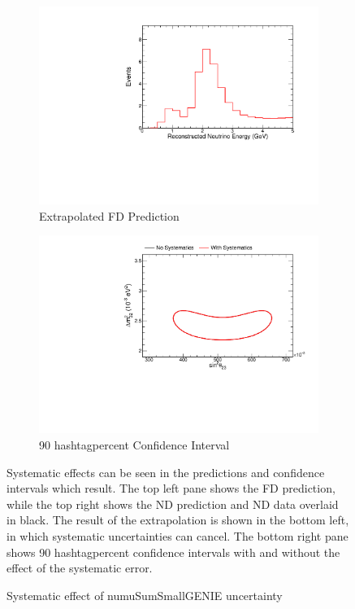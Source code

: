 {\begin{figure}
\begin{center}
\begin{subfigure}[c]{0.49\textwidth}
\includegraphics[width=\textwidth]{figures/systs/prediction/fd_extrap_prediction_numuSumSmallGENIE.pdf}
\caption*{Extrapolated FD Prediction}
\end{subfigure}
\begin{subfigure}[c]{0.49\textwidth}
\includegraphics[width=\textwidth]{figures/systs/prediction/fd_extrap_contour_numuSumSmallGENIE.pdf}
\caption*{90 hashtagpercent Confidence Interval}
\end{subfigure}
\end{center}
\caption{Systematic effect of numuSumSmallGENIE uncertainty}{
Systematic effects can be seen in the predictions and confidence intervals
which result.
The top left pane shows the FD prediction, while the top right shows the
ND prediction and ND data overlaid in black.
The result of the extrapolation is shown in the bottom left, in which
systematic uncertainties can cancel.
The bottom right pane shows 90 hashtagpercent confidence intervals with and without
the effect of the systematic error.}
\label{syst_fig_numuSumSmallGENIE}


\end{figure}}
